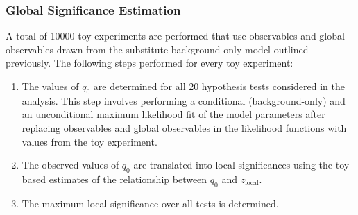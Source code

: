 \subsubsection{Global Significance Estimation}


A total of \num{10000} toy experiments are performed that use observables and
global observables drawn from the substitute background-only model outlined
previously.
The following steps performed for every toy experiment:
\begin{enumerate}

\item The values of $q_0$ are determined for all 20 hypothesis tests considered
  in the analysis. This step involves performing a conditional (background-only)
  and an unconditional maximum likelihood fit of the model parameters after
  replacing observables and global observables in the likelihood functions with
  values from the toy experiment.

\item The observed values of $q_0$ are translated into local significances using
  the toy-based estimates of the relationship between $q_0$ and
  $z_{\text{local}}$.

\item The maximum local significance over all tests is determined.

\end{enumerate}

